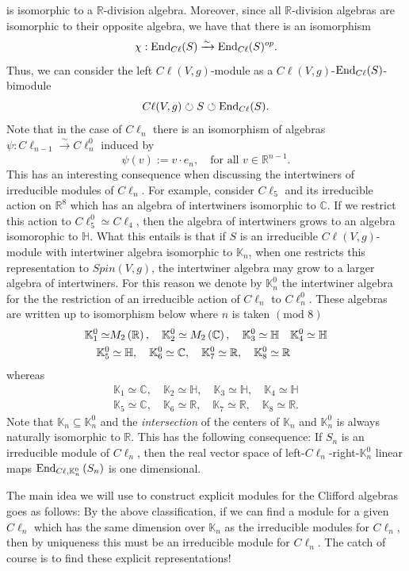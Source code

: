 \documentclass[openany, 11pt]{article}
\theoremstyle{definition}
\theoremstyle{remark}
\def\lp{\ensuremath{\left(}}
\def\rp{\ensuremath{\right)}}
\def\bC{\ensuremath{\mathbb{C}}}
\def\bH{\ensuremath{\mathbb{H}}}
\def\bR{\ensuremath{\mathbb{R}}}
\def\bK{\ensuremath{\mathbb{K}}}
\def\End{\ensuremath{\textnormal{End}}}
\begin{document}
is isomorphic to a $\bR$-division algebra. Moreover, since all $\bR$-division algebras are isomorphic to their opposite algebra, we have that there is an isomorphism
\[
    \chi:\End_{C\ell}(S)\xrightarrow{\sim}\End_{C\ell}(S)^{op}.
\]
Thus, we can consider the left $C\ell(V,g)$-module as a $C\ell(V,g)$-$\End_{C\ell}(S)$-bimodule
\[
    C\ell(V,g)\circlearrowright S\circlearrowleft \End_{C\ell}(S).
\]
Note that in the case of $C\ell_n$ there is an isomorphism of algebras $\psi:C\ell_{n-1}\xrightarrow{\sim} C\ell^0_n$ induced by
\[
    \psi(v):=v\cdot e_n,\quad\text{for all }v\in\bR^{n-1}.
\]
This has an interesting consequence when discussing the intertwiners of irreducible modules of $C\ell_n$. For example, consider $C\ell_5$ and its irreducible action on $\bR^8$ which has an algebra of intertwiners isomorphic to $\bC$. If we restrict this action to $C\ell^0_5\simeq C\ell_4$, then the algebra of intertwiners grows to an algebra isomorophic to $\bH$. What this entails is that if $S$ is an irreducible $C\ell(V,g)$-module with intertwiner algebra isomorphic to $\bK_n$, when one restricts this representation to $Spin(V,g)$, the intertwiner algebra may grow to a larger algebra of intertwiners. For this reason we denote by $\bK^0_n$ the intertwiner algebra for the the restriction of an irreducible action of $C\ell_n$ to $C\ell^0_n$. These algebras are written up to isomorphism below where $n$ is taken $(\text{mod } 8)$
\begin{align*}
    \bK_1^0\simeq& M_2\lp\bR\rp,\quad \bK^0_2\simeq M_2\lp\bC\rp,\quad \bK^0_3\simeq \bH\quad \bK^0_4\simeq \bH\\
    \bK^0_5&\simeq\bH,\quad\bK^0_6\simeq \bC,\quad\bK^0_7\simeq \bR,\quad\bK^0_8\simeq\bR
\end{align*}
whereas
\begin{align*}
    \bK_1\simeq\bC,\quad \bK_2\simeq\bH,\quad\bK_3\simeq \bH,\quad \bK_4\simeq\bH\\
    \bK_5\simeq \bC,\quad \bK_6\simeq\bR,\quad\bK_7\simeq\bR,\quad\bK_8\simeq\bR.
\end{align*}
Note that $\bK_n\subseteq\bK^0_n$ and the \emph{intersection} of the centers of $\bK_n$ and $\bK^0_n$ is always naturally isomorphic to $\bR$. This has the following consequence: If $S_n$ is an irreducible module of $C\ell_n$, then the real vector space of left-$C\ell_n$-right-$\bK^0_n$ linear maps $\End_{C\ell,\bK^0_n}\lp S_n\rp$ is one dimensional.  \par

The main idea we will use to construct explicit modules for the Clifford algebras goes as follows: By the above classification, if we can find a module for a given $C\ell_n$ which has the same dimension over $\bK_n$ as the irreducible modules for $C\ell_n$, then by uniqueness this must be an irreducible module for $C\ell_n$. The catch of course is to find these explicit representations!
\end{document}
